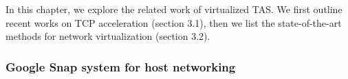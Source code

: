  In this chapter, we explore the related work of virtualized TAS. We first outline recent 
 works on TCP acceleration (section 3.1), then we list the state-of-the-art methods for network virtualization (section 3.2).





\subsubsection{Google Snap system for host networking}
